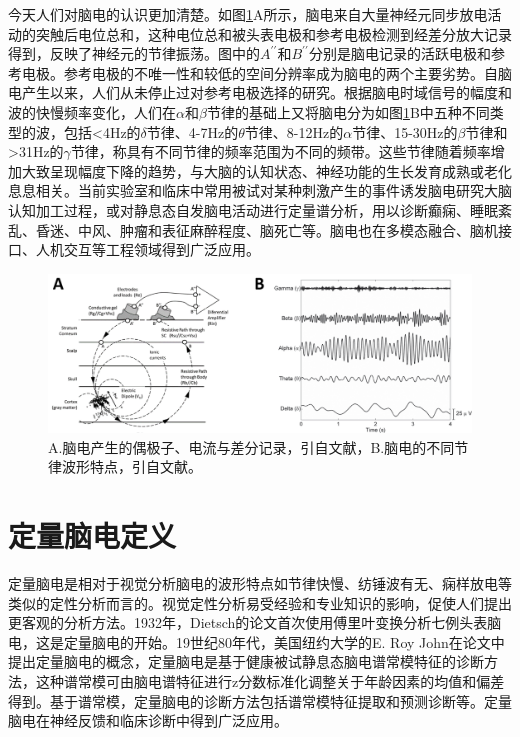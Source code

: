 今天人们对脑电的认识更加清楚。如图\ref{1:record}A所示，脑电来自大量神经元同步放电活动的突触后电位总和，这种电位总和被头表电极和参考电极检测到经差分放大记录得到，反映了神经元的节律振荡。图中的$A^{\prime\prime}$和$B^{\prime\prime}$分别是脑电记录的活跃电极和参考电极。参考电极的不唯一性和较低的空间分辨率成为脑电的两个主要劣势。自脑电产生以来，人们从未停止过对参考电极选择的研究。根据脑电时域信号的幅度和波的快慢频率变化，人们在$\alpha$和$\beta$节律的基础上又将脑电分为如图\ref{1:record}B中五种不同类型的波，包括<4Hz的$\delta$节律、4-7Hz的$\theta$节律、8-12Hz的$\alpha$节律、15-30Hz的$\beta$节律和>31Hz的$\gamma$节律，称具有不同节律的频率范围为不同的频带。这些节律随着频率增加大致呈现幅度下降的趋势，与大脑的认知状态、神经功能的生长发育成熟或老化息息相关。当前实验室和临床中常用被试对某种刺激产生的事件诱发脑电研究大脑认知加工过程，或对静息态自发脑电活动进行定量谱分析，用以诊断癫痫、睡眠紊乱、昏迷、中风、肿瘤和表征麻醉程度、脑死亡等。脑电也在多模态融合、脑机接口、人机交互等工程领域得到广泛应用。
\begin{figure}[!h]
	\includegraphics[width=15cm]{pic/xulun/record.png}
	\caption{A.脑电产生的偶极子、电流与差分记录，引自文献，B.脑电的不同节律波形特点，引自文献。}
	\label{1:record}
\end{figure}


\section{定量脑电定义}
定量脑电是相对于视觉分析脑电的波形特点如节律快慢、纺锤波有无、痫样放电等类似的定性分析而言的。视觉定性分析易受经验和专业知识的影响，促使人们提出更客观的分析方法。1932年，Dietsch的论文首次使用傅里叶变换分析七例头表脑电，这是定量脑电的开始。19世纪80年代，美国纽约大学的E. Roy John在论文中提出定量脑电的概念，定量脑电是基于健康被试静息态脑电谱常模特征的诊断方法，这种谱常模可由脑电谱特征进行z分数标准化调整关于年龄因素的均值和偏差得到。基于谱常模，定量脑电的诊断方法包括谱常模特征提取和预测诊断等。定量脑电在神经反馈和临床诊断中得到广泛应用。

